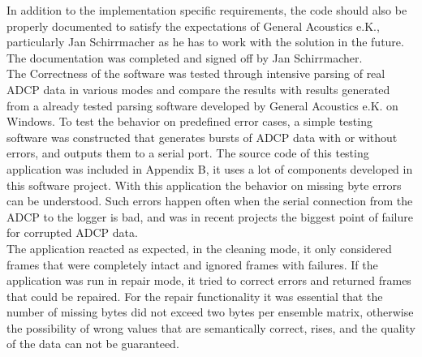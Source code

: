 In addition to the implementation specific requirements, the code should also be properly documented to satisfy the expectations of General Acoustics e.K., particularly Jan Schirrmacher as he has to work with the solution in the future. The documentation was completed and signed off by Jan Schirrmacher.\\
The Correctness of the software was tested through intensive parsing of real ADCP data in various modes and compare the results with results generated from a already tested parsing software developed by General Acoustics e.K. on Windows. To test the behavior on predefined error cases, a simple testing software was constructed that generates bursts of ADCP data with or without errors, and outputs them to a serial port. The source code of this testing application was included in Appendix B, it uses a lot of components developed in this software project. With this application the behavior on missing byte errors can be understood. Such errors happen often when the serial connection from the ADCP to the logger is bad, and was in recent projects the biggest point of failure for corrupted ADCP data.\\
The application reacted as expected, in the cleaning mode, it only considered frames that were completely intact and ignored frames with failures. If the application was run in repair mode, it tried to correct errors and returned frames that could be repaired. For the repair functionality it was essential that the number of missing bytes did not exceed two bytes per ensemble matrix, otherwise the possibility of wrong values that are semantically correct, rises, and the quality of the data can not be guaranteed.\\

